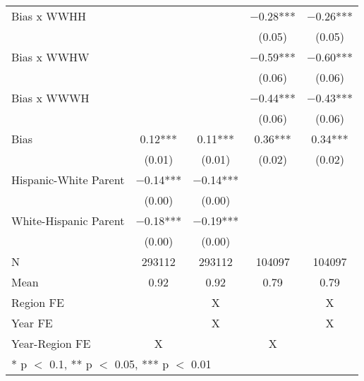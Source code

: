 \begin{longtable}[t]{lcccc}
Bias x WWHH &  &  & \num{-0.28}*** & \num{-0.26}***\\
 &  &  & (\num{0.05}) & (\num{0.05})\\
Bias x WWHW &  &  & \num{-0.59}*** & \num{-0.60}***\\
 &  &  & (\num{0.06}) & \vphantom{1} (\num{0.06})\\
Bias x WWWH &  &  & \num{-0.44}*** & \num{-0.43}***\\
 &  &  & (\num{0.06}) & (\num{0.06})\\
Bias & \num{0.12}*** & \num{0.11}*** & \num{0.36}*** & \num{0.34}***\\
 & (\num{0.01}) & (\num{0.01}) & (\num{0.02}) & (\num{0.02})\\
Hispanic-White Parent & \num{-0.14}*** & \num{-0.14}*** &  & \\
 & (\num{0.00}) & (\num{0.00}) &  \vphantom{1} & \\
White-Hispanic Parent & \num{-0.18}*** & \num{-0.19}*** &  & \\
 & (\num{0.00}) & (\num{0.00}) &  & \\
\midrule
N & \num{293112} & \num{293112} & \num{104097} & \num{104097}\\
Mean & \num{0.92} & \num{0.92} & \num{0.79} & \num{0.79}\\
Region FE &  & X &  & X\\
Year FE &  & X &  & X\\
Year-Region FE & X &  & X & \\*
\multicolumn{5}{l}{\rule{0pt}{1em}* p $<$ 0.1, ** p $<$ 0.05, *** p $<$ 0.01}\\
\end{longtable}
